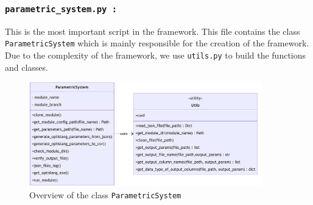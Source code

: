 \subsubsection{\textbf{\texttt{parametric\_system.py :}}}
This is the most important script in the framework. This file contains the class \texttt{ParametricSystem} which is mainly responsible for the creation of the
framework. Due to the complexity of the framework, we use \texttt{utils.py} to build the functions and classes. 
\begin{figure}[!ht]
  \centering
  \includegraphics[width=0.9\textwidth]{Images/parametric_system_class.pdf}
  \caption{Overview of the class \texttt{ParametricSystem}}
  \label{parametric_system_class}
\end{figure}

